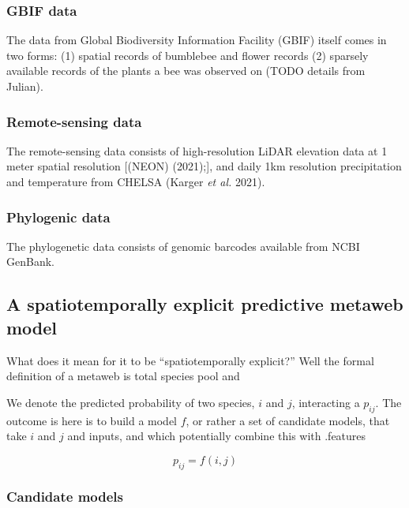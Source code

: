 \documentclass[11pt]{article}
\begin{document}
\hypertarget{gbif-data}{%
\subsubsection{GBIF data}\label{gbif-data}}

The data from Global Biodiversity Information Facility (GBIF) itself
comes in two forms: (1) spatial records of bumblebee and flower records
(2) sparsely available records of the plants a bee was observed on (TODO
details from Julian).

\hypertarget{remote-sensing-data}{%
\subsubsection{Remote-sensing data}\label{remote-sensing-data}}

The remote-sensing data consists of high-resolution LiDAR elevation data
at 1 meter spatial resolution {[}(NEON) (2021);{]}, and daily 1km
resolution precipitation and temperature from CHELSA (Karger \emph{et
al.} 2021).

\hypertarget{phylogenic-data}{%
\subsubsection{Phylogenic data}\label{phylogenic-data}}

The phylogenetic data consists of genomic barcodes available from NCBI
GenBank.

\hypertarget{a-spatiotemporally-explicit-predictive-metaweb-model}{%
\subsection{A spatiotemporally explicit predictive metaweb
model}\label{a-spatiotemporally-explicit-predictive-metaweb-model}}

What does it mean for it to be ``spatiotemporally explicit?'' Well the
formal definition of a metaweb is total species pool and

We denote the predicted probability of two species, \(i\) and \(j\),
interacting a \(p_{ij}\). The outcome is here is to build a model \(f\),
or rather a set of candidate models, that take \(i\) and \(j\) and
inputs, and which potentially combine this with .features

\[p_{ij} = f(i,j)\]

\hypertarget{candidate-models}{%
\subsubsection{Candidate models}\label{candidate-models}}
\end{document}
